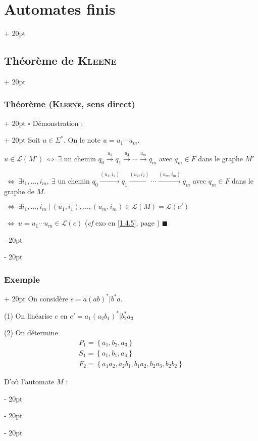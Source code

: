 \documentclass[a4paper, 12pt, twoside]{article}
\newcommand{\set}[1]{\left\{ #1 \right\}}
\newcommand{\ssi}{\ \Leftrightarrow \ }
\newcommand{\ind}[1][20pt]{\advance\leftskip + #1}
\newcommand{\deind}[1][20pt]{\advance\leftskip - #1}
\newenvironment{indt}[2][20pt]{#2 \par \ind[#1]}{\par \deind} %
\newenvironment{proof}[1][{Démonstration :}]{\begin{indt}{$\square$ #1}}{$\blacksquare$ \end{indt}}
\begin{document}
\begin{indt}{\section{Automates finis}}
\begin{indt}{\subsection{Théorème de \textsc{Kleene}}}
\begin{indt}{\subsubsection{Théorème (\textsc{Kleene}, sens direct)}}
\begin{proof}
                    Soit $u \in \Sigma^*$. On le note $u = u_1 \cdots u_m$.

                    $u \in \mathcal L(M') \ssi \exists$ un chemin $q_0 \overset{u_1}{\longrightarrow} q_1 \overset{u_2}{\longrightarrow} \cdots \overset{u_m}{\longrightarrow} q_m$
                    avec $q_m \in F$ dans le graphe $M'$

                    $\ssi \exists i_1, \ldots, i_m,\ \exists$ un chemin $q_0 \overset{(u_1, i_1)}{\longrightarrow} q_1 \overset{(u_2, i_2)}{\longrightarrow} \cdots \overset{(u_m, i_m)}{\longrightarrow} q_m$
                    avec $q_m \in F$ dans le graphe de $M$.

                    $\ssi \exists i_1, \ldots, i_m\ |\ (u_1, i_1), \ldots, (u_m, i_m) \in \mathcal L(M) = \mathcal L(e')$

                    $\ssi u = u_1 \cdots u_m \in \mathcal L(e)$ (\textit{cf} exo en \ref{1.4.5}, page \pageref{1.4.5})
                \end{proof}
            \end{indt}

            \vspace{12pt}
            
            \begin{indt}{\subsubsection{Exemple}}
                On considère $e = a(ab)^* | b^* a$.

                (1) On linéarise $e$ en $e' = a_1(a_2b_1)^* | b_2^* a_3$

                (2) On détermine
                \[
                    \begin{array}{l}
                        P_1 = \set{a_1, b_2, a_3}
                        \\
                        S_1 = \set{a_1, b_1, a_3}
                        \\
                        F_2 = \set{a_1a_2, a_2b_1, b_1a_2, b_2a_3, b_2b_2}
                    \end{array}
                \]

                D'où l'automate $M$ :
                \begin{center}
\end{center}
\end{indt}
\end{indt}
\end{indt}
\end{document}
